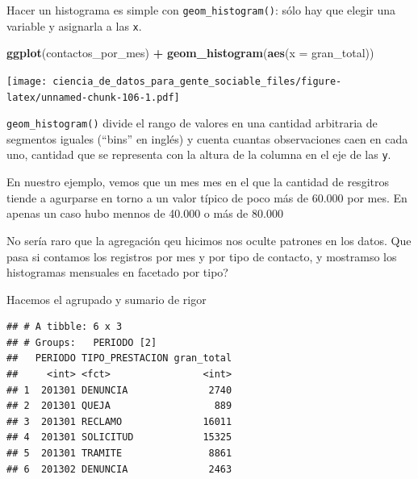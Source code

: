 \documentclass[]{book}
\newenvironment{Shaded}{\begin{snugshade}}{\end{snugshade}}
\newcommand{\KeywordTok}[1]{\textcolor[rgb]{0.13,0.29,0.53}{\textbf{#1}}}
\newcommand{\DataTypeTok}[1]{\textcolor[rgb]{0.13,0.29,0.53}{#1}}
\newcommand{\StringTok}[1]{\textcolor[rgb]{0.31,0.60,0.02}{#1}}
\newcommand{\OperatorTok}[1]{\textcolor[rgb]{0.81,0.36,0.00}{\textbf{#1}}}
\newcommand{\NormalTok}[1]{#1}
\begin{document}
Hacer un histograma es simple con \texttt{geom\_histogram()}: sólo hay
que elegir una variable y asignarla a las \texttt{x}.

\begin{Shaded}
\begin{Highlighting}[]
\KeywordTok{ggplot}\NormalTok{(contactos_por_mes) }\OperatorTok{+}\StringTok{ }
\StringTok{    }\KeywordTok{geom_histogram}\NormalTok{(}\KeywordTok{aes}\NormalTok{(}\DataTypeTok{x =}\NormalTok{ gran_total))}
\end{Highlighting}
\end{Shaded}

\texttt{[image: ciencia\_de\_datos\_para\_gente\_sociable\_files/figure-latex/unnamed-chunk-106-1.pdf]}

\texttt{geom\_histogram()} divide el rango de valores en una cantidad
arbitraria de segmentos iguales (``bins'' en inglés) y cuenta cuantas
observaciones caen en cada uno, cantidad que se representa con la altura
de la columna en el eje de las \texttt{y}.

En nuestro ejemplo, vemos que un mes mes en el que la cantidad de
resgitros tiende a agurparse en torno a un valor típico de poco más de
60.000 por mes. En apenas un caso hubo mennos de 40.000 o más de 80.000

No sería raro que la agregación qeu hicimos nos oculte patrones en los
datos. Que pasa si contamos los registros por mes y por tipo de
contacto, y mostramso los histogramas mensuales en facetado por tipo?

Hacemos el agrupado y sumario de rigor

\begin{Shaded}
\end{Shaded}

\begin{verbatim}
## # A tibble: 6 x 3
## # Groups:   PERIODO [2]
##   PERIODO TIPO_PRESTACION gran_total
##     <int> <fct>                <int>
## 1  201301 DENUNCIA              2740
## 2  201301 QUEJA                  889
## 3  201301 RECLAMO              16011
## 4  201301 SOLICITUD            15325
## 5  201301 TRAMITE               8861
## 6  201302 DENUNCIA              2463
\end{verbatim}
\end{document}
